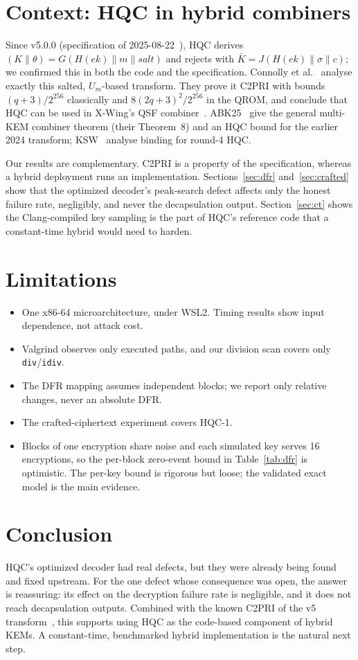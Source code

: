 \documentclass[11pt,a4paper]{article}
\begin{document}
\section{Context: HQC in hybrid combiners}\label{sec:c2pri}
Since v5.0.0 (specification of 2025-08-22~\cite{HQCspec25}), HQC derives $(K\|\theta)=G(H(ek)\|m\|\mathit{salt})$ and rejects with $\bar K=J(H(ek)\|\sigma\|c)$; we confirmed this in both the code and the specification. Connolly et al.~\cite{Starfighters} analyse exactly this salted, $U_m$-based transform. They prove it C2PRI with bounds $(q+3)/2^{256}$ classically and $8(2q+3)^2/2^{256}$ in the QROM, and conclude that HQC can be used in X-Wing's QSF combiner~\cite{XWing24}. ABK25~\cite{ABK25} give the general multi-KEM combiner theorem (their Theorem~8) and an HQC bound for the earlier 2024 transform; KSW~\cite{KSW24} analyse binding for round-4 HQC.

Our results are complementary. C2PRI is a property of the specification, whereas a hybrid deployment runs an implementation. Sections~\ref{sec:dfr} and~\ref{sec:crafted} show that the optimized decoder's peak-search defect affects only the honest failure rate, negligibly, and never the decapsulation output. Section~\ref{sec:ct} shows the Clang-compiled key sampling is the part of HQC's reference code that a constant-time hybrid would need to harden.

\section{Limitations}
\begin{itemize}
\item One x86-64 microarchitecture, under WSL2. Timing results show input dependence, not attack cost.
\item Valgrind observes only executed paths, and our division scan covers only \texttt{div}/\texttt{idiv}.
\item The DFR mapping assumes independent blocks; we report only relative changes, never an absolute DFR.
\item The crafted-ciphertext experiment covers HQC-1.
\item Blocks of one encryption share noise and each simulated key serves 16 encryptions, so the per-block zero-event bound in Table~\ref{tab:dfr} is optimistic. The per-key bound is rigorous but loose; the validated exact model is the main evidence.
\end{itemize}

\section{Conclusion}
HQC's optimized decoder had real defects, but they were already being found and fixed upstream. For the one defect whose consequence was open, the answer is reassuring: its effect on the decryption failure rate is negligible, and it does not reach decapsulation outputs. Combined with the known C2PRI of the v5 transform~\cite{Starfighters}, this supports using HQC as the code-based component of hybrid KEMs. A constant-time, benchmarked hybrid implementation is the natural next step.



\end{document}
